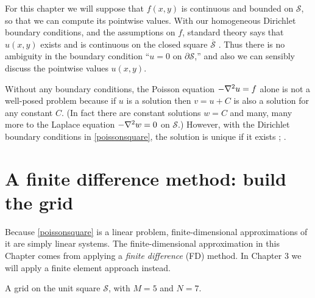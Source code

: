 For this chapter we will suppose that $f(x,y)$ is continuous and bounded on $\mathcal{S}$, so that we can compute its pointwise values.  With our homogeneous Dirichlet boundary conditions, and the assumptions on $f$, standard theory says that $u(x,y)$ exists and is continuous on the closed square $\overline{\mathcal{S}}$ \citep[Theorem 6 in section 5.6]{Evans}.  Thus there is no ambiguity in the boundary condition ``$u=0$ on $\partial \mathcal{S}$,'' and also we can sensibly discuss the pointwise values $u(x,y)$.

Without any boundary conditions, the Poisson equation $-\nabla^2 u = f$ alone is not a well-posed problem because if $u$ is a solution then $v=u+C$ is also a solution for any constant $C$.  (In fact there are constant solutions $w=C$ and many, many more to the Laplace equation $-\nabla^2 w = 0$ on $\mathcal{S}$.)  However, with the Dirichlet boundary conditions in \eqref{poissonsquare}, the solution is unique if it exists \citep[Theorem 5 in section 2.2]{Evans}; \citep[subsection 5.2.1]{Ockendonetal2003}.


\section{A finite difference method: build the grid}

Because \eqref{poissonsquare} is a linear problem, finite-dimensional approximations of it are simply linear systems.  The finite-dimensional approximation in this Chapter comes from applying a \emph{finite difference} (FD) method.  In Chapter 3 we will apply a finite element approach instead.

\begin{marginfigure}
\caption{A grid on the unit square $\mathcal{S}$, with $M=5$ and $N=7$.}
\label{fig:unitsquaregrid}
\end{marginfigure}

